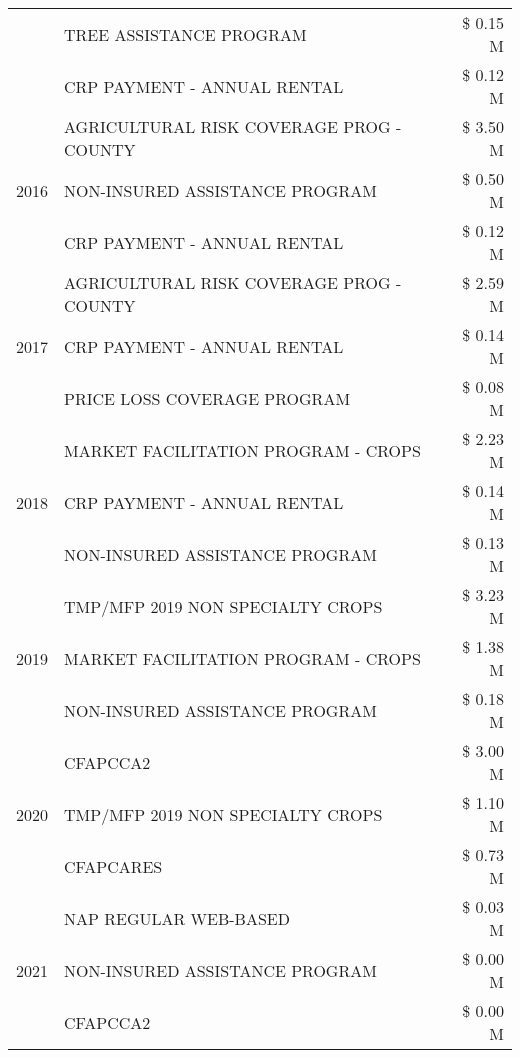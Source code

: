 \begin{tabular}{llr}
 & TREE ASSISTANCE PROGRAM & \$ 0.15 M \\
 & CRP PAYMENT - ANNUAL RENTAL & \$ 0.12 M \\
\cline{1-3}
\multirow[t]{3}{*}{2016} & AGRICULTURAL RISK COVERAGE PROG - COUNTY & \$ 3.50 M \\
 & NON-INSURED ASSISTANCE PROGRAM & \$ 0.50 M \\
 & CRP PAYMENT - ANNUAL RENTAL & \$ 0.12 M \\
\cline{1-3}
\multirow[t]{3}{*}{2017} & AGRICULTURAL RISK COVERAGE PROG - COUNTY & \$ 2.59 M \\
 & CRP PAYMENT - ANNUAL RENTAL & \$ 0.14 M \\
 & PRICE LOSS COVERAGE PROGRAM & \$ 0.08 M \\
\cline{1-3}
\multirow[t]{3}{*}{2018} & MARKET FACILITATION PROGRAM - CROPS & \$ 2.23 M \\
 & CRP PAYMENT - ANNUAL RENTAL & \$ 0.14 M \\
 & NON-INSURED ASSISTANCE PROGRAM & \$ 0.13 M \\
\cline{1-3}
\multirow[t]{3}{*}{2019} & TMP/MFP 2019 NON SPECIALTY CROPS & \$ 3.23 M \\
 & MARKET FACILITATION PROGRAM - CROPS & \$ 1.38 M \\
 & NON-INSURED ASSISTANCE PROGRAM & \$ 0.18 M \\
\cline{1-3}
\multirow[t]{3}{*}{2020} & CFAPCCA2 & \$ 3.00 M \\
 & TMP/MFP 2019 NON SPECIALTY CROPS & \$ 1.10 M \\
 & CFAPCARES & \$ 0.73 M \\
\cline{1-3}
\multirow[t]{3}{*}{2021} & NAP REGULAR WEB-BASED & \$ 0.03 M \\
 & NON-INSURED ASSISTANCE PROGRAM & \$ 0.00 M \\
 & CFAPCCA2 & \$ 0.00 M \\
\cline{1-3}
\bottomrule
\end{tabular}
